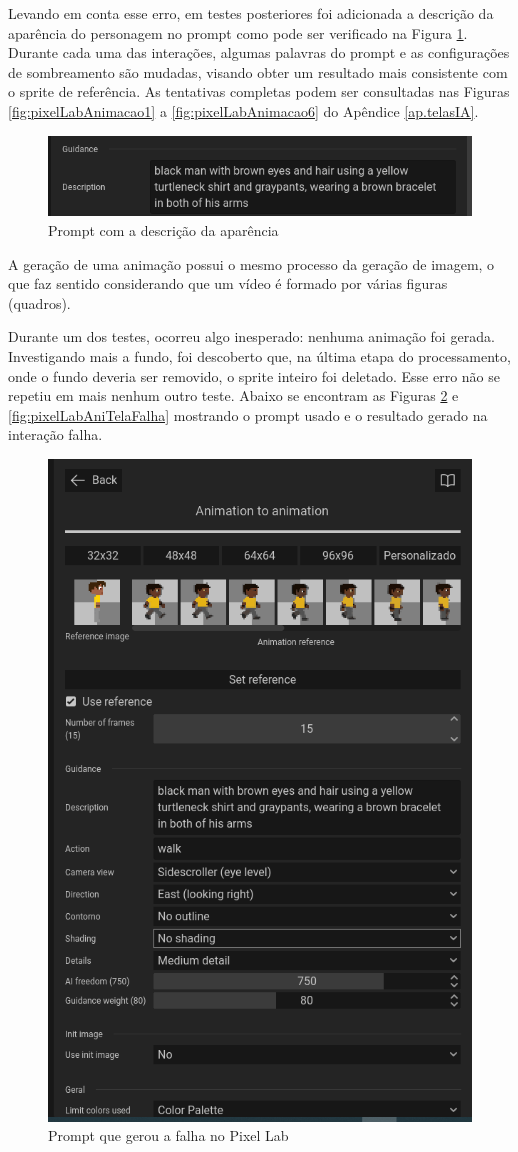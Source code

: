 Levando em conta esse erro, em testes posteriores foi adicionada a descrição da aparência do personagem no prompt como pode ser verificado na Figura \ref{fig:pixelLabAniPrompt}. Durante cada uma das interações, algumas palavras do prompt e as configurações de sombreamento são mudadas, visando obter um resultado mais consistente com o sprite de referência. As tentativas completas podem ser consultadas nas Figuras \ref{fig:pixelLabAnimacao1} a \ref{fig:pixelLabAnimacao6} do Apêndice \ref{ap.telasIA}. 

\begin{figure}[htbp]
    \centering
    \caption{\small Prompt com a descrição da aparência}
    \label{fig:pixelLabAniPrompt}
    \includegraphics[width=0.7\linewidth]{figs/pixelLab/dia3/prompt.PNG}
\end{figure}

A geração de uma animação possui o mesmo processo da geração de imagem, o que faz sentido considerando que um vídeo é formado por várias figuras (quadros). 

Durante um dos testes, ocorreu algo inesperado: nenhuma animação foi gerada. Investigando mais a fundo, foi descoberto que, na última etapa do processamento, onde o fundo deveria ser removido, o sprite inteiro foi deletado. Esse erro não se repetiu em mais nenhum outro teste. Abaixo se encontram as Figuras \ref{fig:pixelLabAniPromptFalha} e \ref{fig:pixelLabAniTelaFalha} mostrando o prompt usado e o resultado gerado na interação falha.


\begin{figure}[htbp]
    \centering
    \caption{\small Prompt que gerou a falha no Pixel Lab}
    \label{fig:pixelLabAniPromptFalha}
    \includegraphics[width=0.53\linewidth]{figs/pixelLab/dia3/tela_3.PNG}
\end{figure}

